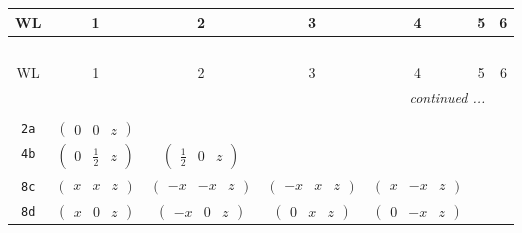 \documentclass[fleqn,9pt,landscape]{jsarticle}
\begin{document}
\begin{center}
\renewcommand{\arraystretch}{1.2}
\begin{longtable}{ccccccc}
 \hline \hline
WL & 1 & 2 & 3 & 4 & 5 & 6 \\ \hline \endfirsthead

\multicolumn{6}{l}{\tablename\ \thetable{}} \\
 \hline \hline
WL & 1 & 2 & 3 & 4 & 5 & 6 \\ \hline \endhead

 \hline \hline
\multicolumn{6}{r}{\footnotesize\it continued ...} \\ \endfoot

 \hline \hline
\multicolumn{6}{r}{} \\ \endlastfoot

{\tt 2a} & $ \begin{pmatrix} 0 & 0 & z \end{pmatrix} $ & $  $ & $  $ & $  $ & $  $ & $  $ \\ \hline
{\tt 4b} & $ \begin{pmatrix} 0 & \frac{1}{2} & z \end{pmatrix} $ & $ \begin{pmatrix} \frac{1}{2} & 0 & z \end{pmatrix} $ & $  $ & $  $ & $  $ & $  $ \\ \hline
{\tt 8c} & $ \begin{pmatrix} x & x & z \end{pmatrix} $ & $ \begin{pmatrix} - x & - x & z \end{pmatrix} $ & $ \begin{pmatrix} - x & x & z \end{pmatrix} $ & $ \begin{pmatrix} x & - x & z \end{pmatrix} $ & $  $ & $  $ \\ \hline
{\tt 8d} & $ \begin{pmatrix} x & 0 & z \end{pmatrix} $ & $ \begin{pmatrix} - x & 0 & z \end{pmatrix} $ & $ \begin{pmatrix} 0 & x & z \end{pmatrix} $ & $ \begin{pmatrix} 0 & - x & z \end{pmatrix} $ & $  $ & $  $ \\ \hline

\end{longtable}
\end{center}
\end{document}
